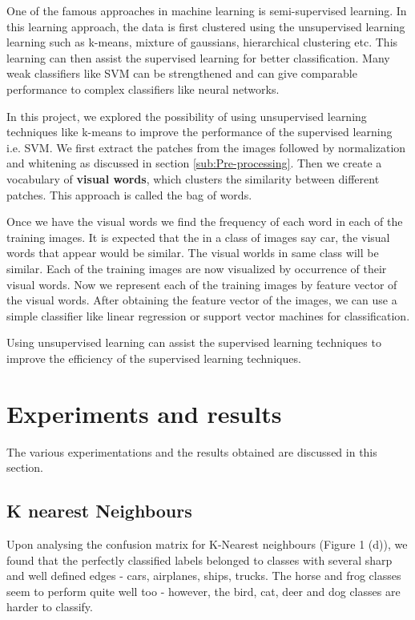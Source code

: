 \documentclass{article} %
\begin{document}
One of the famous approaches in machine learning is semi-supervised learning. In this learning approach, the data is first clustered using the unsupervised learning learning such as k-means, mixture of gaussians, hierarchical clustering etc. This learning can then assist the supervised learning for better classification. Many weak classifiers \cite{andrew} like SVM can be strengthened and can give comparable performance to complex classifiers like neural networks.

In this project, we explored the possibility of using unsupervised learning techniques like k-means to improve the performance of the supervised learning i.e. SVM. We first extract the patches from the images followed by normalization and whitening as discussed in section \ref{sub:Pre-processing}. Then we create a vocabulary of \textbf{visual words}, which clusters the similarity between different patches. This approach is called the bag of words.

Once we have the visual words we find the frequency of each word in each of the training images. It is expected that the in a class of images say car, the visual words that appear would be similar. The visual worlds in same class will be similar. Each of the training images are now  visualized by occurrence of their visual words. Now we represent each of the training images by feature vector of the visual words. After obtaining the feature vector of the images, we can use a simple classifier like linear regression or support vector machines for classification.

Using unsupervised learning can assist the supervised learning techniques to improve the efficiency of the supervised learning techniques.

\section{Experiments and results} %
\label{sub:Results}
The various experimentations and the results obtained are discussed in this section.

\subsection{K nearest Neighbours}
    Upon analysing the confusion matrix for K-Nearest neighbours (Figure 1 (d)), we found that the perfectly classified labels belonged to classes with several sharp and well defined edges - cars, airplanes, ships, trucks. The horse and frog classes seem to perform quite well too - however, the bird, cat, deer and dog classes are harder to classify.\\
\end{document}
